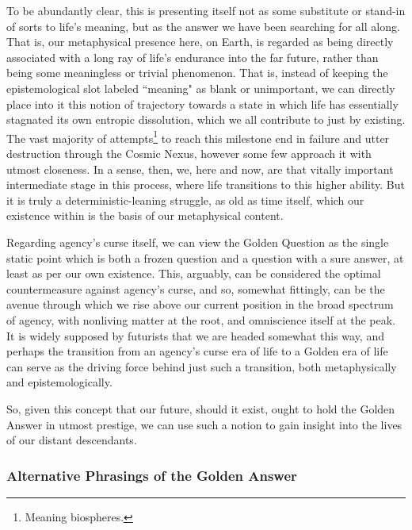 To be abundantly clear, this is presenting itself not as some substitute or stand-in of sorts to life's meaning, but as the answer we have been searching for all along. That is, our metaphysical presence here, on Earth, is regarded as being directly associated with a long ray of life's endurance into the far future, rather than being some meaningless or trivial phenomenon. That is, instead of keeping the epistemological slot labeled ``meaning" as blank or unimportant, we can directly place into it this notion of trajectory towards a state in which life has essentially stagnated its own entropic dissolution, which we all contribute to just by existing. The vast majority of attempts\footnote{Meaning biospheres.} to reach this milestone end in failure and utter destruction through the Cosmic Nexus, however some few approach it with utmost closeness. In a sense, then, we, here and now, are that vitally important intermediate stage in this process, where life transitions to this higher ability. But it is truly a deterministic-leaning struggle, as old as time itself, which our existence within is the basis of our metaphysical content. 

Regarding agency's curse itself, we can view the Golden Question as the single static point which is both a frozen question and a question with a sure answer, at least as per our own existence. This, arguably, can be considered the optimal countermeasure against agency's curse, and so, somewhat fittingly, can be the avenue through which we rise above our current position in the broad spectrum of agency, with nonliving matter at the root, and omniscience itself at the peak. It is widely supposed by futurists that we are headed somewhat this way, and perhaps the transition from an agency's curse era of life to a Golden era of life can serve as the driving force behind just such a transition, both metaphysically and epistemologically. 

So, given this concept that our future, should it exist, ought to hold the Golden Answer in utmost prestige, we can use such a notion to gain insight into the lives of our distant descendants. 

\subsubsection{Alternative Phrasings of the Golden Answer}


